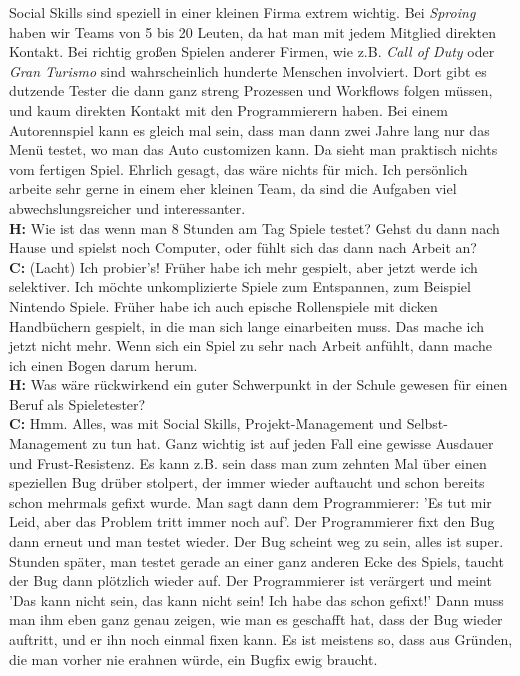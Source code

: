 \documentclass[10pt,a4paper,ngerman,twoside]{article} %
\begin{document}
Social Skills sind speziell in einer kleinen Firma extrem wichtig. Bei \textit{Sproing} haben wir Teams von 5 bis 20 Leuten, da hat man mit jedem Mitglied direkten Kontakt. Bei richtig großen Spielen anderer Firmen, wie z.B. \textit{Call of Duty} oder \textit{Gran Turismo} sind wahrscheinlich hunderte Menschen involviert. Dort gibt es dutzende Tester die dann ganz streng Prozessen und Workflows folgen müssen, und kaum direkten Kontakt mit den Programmierern haben. Bei einem  Autorennspiel kann es gleich mal sein, dass  man dann zwei Jahre lang nur das Menü testet, wo man das Auto customizen kann. Da sieht man praktisch nichts vom fertigen Spiel. Ehrlich gesagt, das wäre nichts für mich. Ich persönlich arbeite sehr gerne in einem eher kleinen Team, da sind die Aufgaben viel abwechslungsreicher und interessanter. \\
\textbf{H:} Wie ist das wenn man 8 Stunden am Tag Spiele testet? Gehst du dann nach Hause und spielst noch Computer, oder fühlt sich das dann nach Arbeit an? \\
\textbf{C:} (Lacht) Ich probier's! Früher habe ich mehr gespielt, aber jetzt werde ich selektiver. Ich möchte unkomplizierte Spiele zum Entspannen, zum Beispiel Nintendo Spiele. Früher habe ich auch epische Rollenspiele mit dicken Handbüchern gespielt, in die man sich lange einarbeiten muss. Das mache ich jetzt nicht mehr. Wenn sich ein Spiel zu sehr nach Arbeit anfühlt, dann mache ich einen Bogen darum herum. \\
\textbf{H:} Was wäre rückwirkend ein guter Schwerpunkt in der Schule gewesen für einen Beruf als Spieletester? \\
\textbf{C:} Hmm. Alles, was mit Social Skills, Projekt-Management und Selbst-Management zu tun hat. Ganz wichtig ist auf jeden Fall eine gewisse Ausdauer und Frust-Resistenz. Es kann z.B. sein dass man zum zehnten Mal über einen speziellen Bug drüber stolpert, der immer wieder auftaucht und schon bereits schon mehrmals gefixt wurde. Man sagt dann dem Programmierer: 'Es tut mir Leid, aber das Problem tritt immer noch auf'. Der Programmierer fixt den Bug dann erneut und man testet wieder. Der Bug scheint weg zu sein, alles ist super. Stunden später, man testet gerade an einer ganz anderen Ecke des Spiels, taucht der Bug dann plötzlich wieder auf. Der Programmierer ist verärgert und meint 'Das kann nicht sein, das kann nicht sein! Ich habe das schon gefixt!' Dann muss man ihm eben ganz genau zeigen, wie man es geschafft hat, dass der Bug wieder auftritt, und er ihn noch einmal fixen kann. Es ist meistens so, dass aus Gründen, die man vorher nie erahnen würde, ein Bugfix ewig braucht. \\
\end{document}
